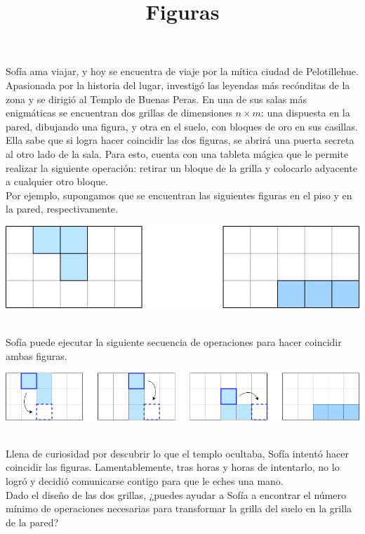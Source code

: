\documentclass{oci}
\title{Figuras}
\begin{document}
\begin{problemDescription}
Sofía ama viajar, y hoy se encuentra de viaje por la mítica ciudad de Pelotillehue.\\

Apasionada por la historia del lugar, investigó las leyendas más recónditas de la zona y se dirigió al Templo de Buenas Peras. En una de sus salas más enigmáticas se encuentran dos grillas de dimensiones $n \times m$: una dispuesta en la pared, dibujando una figura, y otra en el suelo, con bloques de oro en sus casillas. \\

Ella sabe que si logra hacer coincidir las dos figuras, se abrirá una puerta secreta al otro lado de la sala. Para esto, cuenta con una tableta mágica que le permite realizar la siguiente operación: retirar un bloque de la grilla y colocarlo adyacente a cualquier otro bloque. \\

Por ejemplo, supongamos que se encuentran las siguientes figuras en el piso y en la pared, respectivamente. \\
    
\begin{center}
    \includegraphics[scale=0.7]{figura1.png}
\end{center}


\\

Sofía puede ejecutar la siguiente secuencia de operaciones para hacer coincidir ambas figuras. \\

\begin{center}
    \includegraphics[scale=0.5]{figurras2.png}
\end{center}

\\

Llena de curiosidad por descubrir lo que el templo ocultaba, Sofía intentó hacer coincidir las figuras. Lamentablemente, tras horas y horas de intentarlo, no lo logró y decidió comunicarse contigo para que le eches una mano. \\

Dado el diseño de las dos grillas, ¿puedes ayudar a Sofía a encontrar el número mínimo de operaciones necesarias para transformar la grilla del suelo en la grilla de la pared?

\end{problemDescription}
\end{document}
